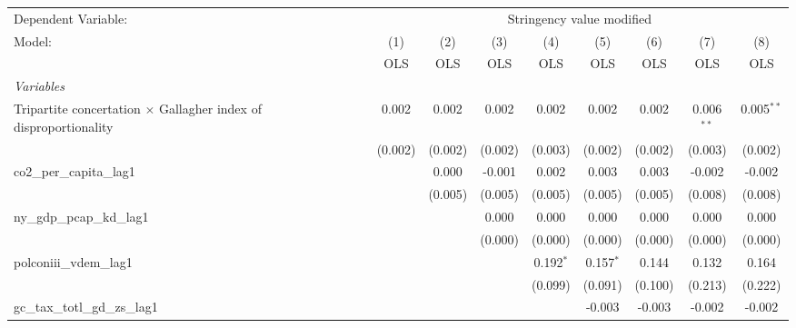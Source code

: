 
\begingroup
\centering
\begin{tabular}{lcccccccc}
   \toprule
   Dependent Variable: & \multicolumn{8}{c}{Stringency value modified}\\
   Model:                                                                  & (1)     & (2)     & (3)     & (4)         & (5)         & (6)     & (7)          & (8)\\  
                                                                           &  OLS    & OLS     & OLS     & OLS         & OLS         & OLS     & OLS          & OLS\\  
   \midrule
   \emph{Variables}\\
   Tripartite concertation $\times$ Gallagher index of disproportionality  & 0.002   & 0.002   & 0.002   & 0.002       & 0.002       & 0.002   & 0.006$^{**}$ & 0.005$^{**}$\\   
                                                                           & (0.002) & (0.002) & (0.002) & (0.003)     & (0.002)     & (0.002) & (0.003)      & (0.002)\\   
   co2\_per\_capita\_lag1                                                  &         & 0.000   & -0.001  & 0.002       & 0.003       & 0.003   & -0.002       & -0.002\\   
                                                                           &         & (0.005) & (0.005) & (0.005)     & (0.005)     & (0.005) & (0.008)      & (0.008)\\   
   ny\_gdp\_pcap\_kd\_lag1                                                 &         &         & 0.000   & 0.000       & 0.000       & 0.000   & 0.000        & 0.000\\   
                                                                           &         &         & (0.000) & (0.000)     & (0.000)     & (0.000) & (0.000)      & (0.000)\\   
   polconiii\_vdem\_lag1                                                   &         &         &         & 0.192$^{*}$ & 0.157$^{*}$ & 0.144   & 0.132        & 0.164\\   
                                                                           &         &         &         & (0.099)     & (0.091)     & (0.100) & (0.213)      & (0.222)\\   
   gc\_tax\_totl\_gd\_zs\_lag1                                             &         &         &         &             & -0.003      & -0.003  & -0.002       & -0.002\\   

\end{tabular}
